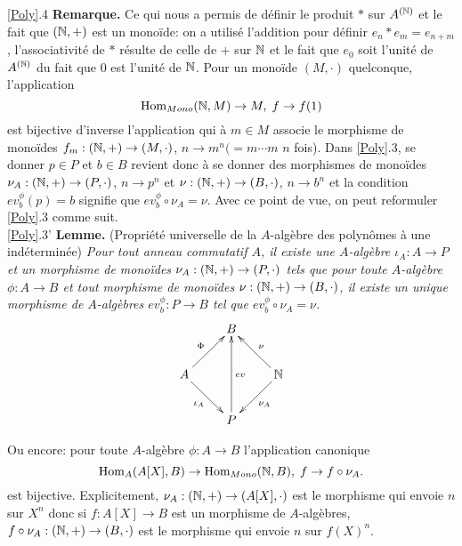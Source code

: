  
   \ref{Poly}.4 \textbf{Remarque.} Ce qui nous a permis de définir le produit $*$ sur $A^{(\mathbb{N})}$ et le fait que $(\mathbb{N},+)$ est un monoïde: on a utilisé l'addition pour définir $e_n*e_m=e_{n+m}$, l'associativité de $*$ résulte de celle de $+$ sur $\mathbb{N}$ et le fait que $e_0$ soit l'unité de $A^{(\mathbb{N})}$ du fait que $0$ est l'unité de $\mathbb{N}$.  Pour un monoïde $(M,\cdot)$ quelconque, l'application
 $$\hbox{\rm Hom}_{Mono}(\mathbb{N},M)\rightarrow M,\; f\rightarrow f(1)$$
 est bijective d'inverse l'application qui à $m\in M$ associe le morphisme de monoïdes $f_m:(\mathbb{N},+)\rightarrow (M,\cdot)$, $n\rightarrow m^n(=m\cdots m$ $n$ fois). Dans \ref{Poly}.3, se donner $p\in P$ et $b\in B$ revient donc à se donner des morphismes de monoïdes $\nu_A:(\mathbb{N},+)\rightarrow (P,\cdot)$, $n\rightarrow p^n$ et $\nu:(\mathbb{N},+)\rightarrow (B,\cdot)$, $n\rightarrow b^n$ et la condition $ev^\phi_b(p)=b$ signifie que $ev^\phi_b\circ \nu_A=\nu$. Avec ce point de vue, on peut reformuler \ref{Poly}.3 comme suit. \\
 
  \ref{Poly}.3' \textbf{Lemme.} (Propriété universelle de la $A$-algèbre des polynômes à une indéterminée) \textit{Pour tout anneau commutatif $A$, il existe une $A$-algèbre $\iota_A: A\rightarrow P$ et un morphisme de monoïdes $\nu_A:(\mathbb{N},+)\rightarrow (P,\cdot)$ tels que pour toute $A$-algèbre $\phi: A\rightarrow B$ et tout morphisme de monoïdes $\nu:(\mathbb{N},+)\rightarrow (B,\cdot)$, il existe un unique  morphisme de $A$-algèbres $ev^\phi_b:P\rightarrow B$  tel que $ ev^\phi_b\circ \nu_A=\nu$. }\\

  $$ \xymatrix{ & B \\ A \ar[ru]^\Phi \ar[rd]_{\iota_A} & & \mathbb{N} \ar[lu]_\nu \ar[ld]^{\nu_A} \\ & P \ar[uu]_{ev} } $$

 Ou encore: pour toute $A$-algèbre $\phi:A\rightarrow B$  l'application canonique
$$\hbox{\rm Hom}_A(A[X],B)\rightarrow \hbox{\rm Hom}_{Mono}(\mathbb{N},B),\; f\rightarrow f\circ \nu_A.$$
 est bijective. Explicitement, $\nu_A:(\mathbb{N},+)\rightarrow (A[X],\cdot)$ est le morphisme qui envoie $n$ sur $X^n$ donc si $f:A[X]\rightarrow B$ est un morphisme de $A$-algèbres, $f\circ \nu_A:(\mathbb{N},+)\rightarrow (B,\cdot)$  est le morphisme qui envoie $n$ sur $f(X)^n$.\\

 
 
